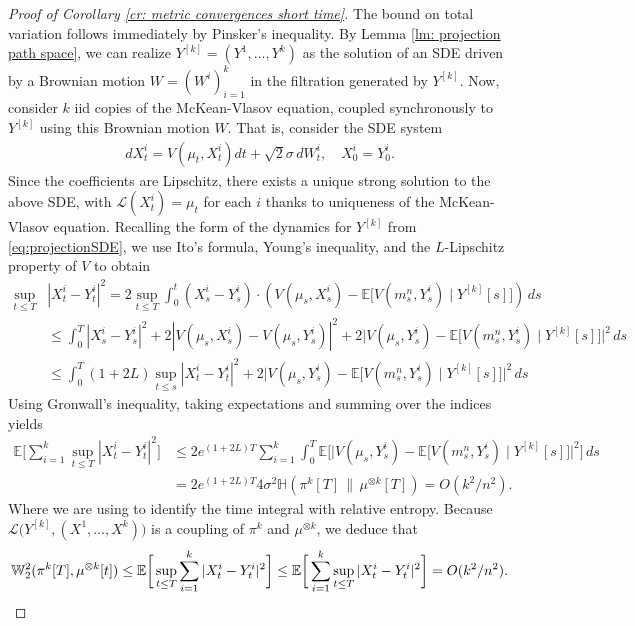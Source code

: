 \documentclass[11pt,reqno]{amsart}
\numberwithin{equation}{section}
\theoremstyle{definition}
\def\E{{\mathbb E}}
\def\Law{\mathcal{L}}
\newcommand{\W}{\mathbb W}
\newcommand{\ent}{ \mathbb H}
\begin{document}
\begin{proof}[Proof of Corollary \ref{cr: metric convergences short time}]
The bound on total variation follows immediately by Pinsker's inequality. By Lemma \ref{lm: projection path space}, we can realize $Y^{[k]}=(Y^1,\ldots,Y^k)$ as the solution of an SDE driven by a Brownian motion $W=( W^i)_{i=1}^k$ in the filtration generated by $Y^{[k]}$.
Now, consider $k$ iid copies of the McKean-Vlasov equation, coupled synchronously to $Y^{[k]}$ using this Brownian motion $W$. That is, consider the SDE system
\begin{align*}
dX_t^i =  V(\mu_t,X^i_t)dt + \sqrt 2 \sigma\,d W_t^i, \quad X^i_0=Y^i_0.
\end{align*}
Since the coefficients are Lipschitz, there exists a unique strong solution to the above SDE, with $\Law(X_t^i)=\mu_t$ for each $i$ thanks to uniqueness of the McKean-Vlasov equation. Recalling the form of the dynamics for $Y^{[k]}$ from \eqref{eq:projectionSDE}, we use Ito's formula, Young's inequality, and the $L$-Lipschitz property of $ V$ to obtain
\begin{align*}
    \sup_{t\leq T}&|X_t^i-Y_t^i|^2=2\sup_{t\leq T}\int_0^t (X_s^i-Y_s^i) \cdot ( V(\mu_s,X^i_s)-\E\big[ V(m_s^n,Y_s^i)\mid Y^{[k]}[s]\big])\,ds\\
    &\leq \int_0^T |X_s^i-Y_s^i|^2+2| V(\mu_s,X_s^i)- V(\mu_s,Y_s^i)|^2+2\Big| V(\mu_s,Y_s^i)-\E\big[ V(m_s^n,Y_s^i)\mid Y^{[k]}[s]\big]\Big|^2\,ds\\
    &\leq \int_0^T (1+2L)\sup_{t\leq s}|X_t^i-Y_t^i|^2+2\Big| V(\mu_s,Y_s^i)-\E\big[ V(m_s^n,Y_s^i)\mid Y^{[k]}[s]\big]\Big|^2\,ds
\end{align*}
Using Gronwall's inequality, taking expectations and summing over the indices yields
\begin{align*}
    \E\bigg[\sum_{i=1}^k\sup_{t\leq T}|X_t^i-Y_t^i|^2\bigg]&\leq 2e^{(1+2L)T}\sum_{i=1}^k\int_0^T \E\bigg[\Big| V(\mu_s,Y_s^i)-\E\big[ V(m_s^n,Y_s^i)\mid Y^{[k]}[s]\big]\Big|^2\bigg]\,ds\\
    &=2e^{(1+2L)T}4\sigma^2\ent (\pi^k[T]\,\|\,\mu^{\otimes k}[T])=O(k^2/n^2).
\end{align*}
Where we are using \cite[Lemma 4.4]{HierarchiesPaper} to identify the time integral with relative entropy. Because $\Law\big(Y^{[k]},(X^1,\dots,X^k)\big)$ is a coupling of $\pi^k$ and $\mu^{\otimes k}$, we deduce that
\begin{equation*}
\W_2^2(\pi^k[T],\mu^{\otimes k}[t])\leq\E\bigg[\sup_{t\leq T}\sum_{i=1}^k |X_t^i-Y_t^i|^2\bigg]\leq \E\bigg[\sum_{i=1}^k\sup_{t\leq T}|X_t^i-Y_t^i|^2\bigg]=O(k^2/n^2). \qedhere
\end{equation*}
\end{proof}
\end{document}
